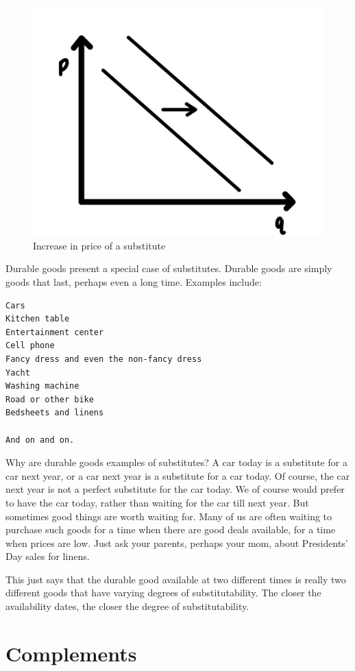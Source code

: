 \documentclass[
]{book}
\begin{document}
\begin{figure}

{\centering \includegraphics[width=0.75\linewidth]{img/ch3/fig7} 

}

\caption{Increase in price of a substitute}\label{fig:fig307}
\end{figure}

Durable goods present a special case of substitutes. Durable goods are simply goods that last, perhaps even a long time. Examples include:

\begin{verbatim}
Cars
Kitchen table
Entertainment center
Cell phone
Fancy dress and even the non-fancy dress
Yacht
Washing machine
Road or other bike
Bedsheets and linens

And on and on. 
\end{verbatim}

Why are durable goods examples of substitutes? A car today is a substitute for a car next year, or a car next year is a substitute for a car today. Of course, the car next year is not a perfect substitute for the car today. We of course would prefer to have the car today, rather than waiting for the car till next year. But sometimes good things are worth waiting for. Many of us are often waiting to purchase such goods for a time when there are good deals available, for a time when prices are low. Just ask your parents, perhaps your mom, about Presidents' Day sales for linens.

This just says that the durable good available at two different times is really two different goods that have varying degrees of substitutability. The closer the availability dates, the closer the degree of substitutability.

\hypertarget{complements}{%
\section{Complements}\label{complements}}
\end{document}
